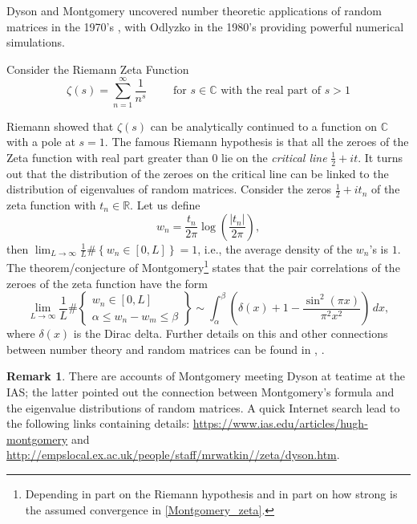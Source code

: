 \documentclass[letterpaper,11pt,oneside,reqno]{amsart}
\numberwithin{equation}{section}
\theoremstyle{definition}
\newtheorem{remark}[proposition]{Remark}
\begin{document}
Dyson and Montgomery uncovered number theoretic applications of random matrices 
in the 1970's \cite{montgomery1973pair}, with Odlyzko in the 1980's \cite{odlyzko1987distribution} providing powerful numerical simulations.

Consider the Riemann Zeta Function
\begin{equation*}
\zeta(s)=\sum_{n=1}^{\infty}\frac{1}{n^s} \qquad \text{ for } s\in \mathbb C \text{ with the real part of } s>1
\end{equation*}

Riemann showed that $\zeta(s)$ can be analytically continued to a function on
$\mathbb C$ with a pole at $s=1$.  The famous Riemann hypothesis is that all
the zeroes of the Zeta function with real part greater than 0 lie on the
\emph{critical line} $\frac{1}2+i t$.  It turns out that the distribution of
the zeroes on the critical line can be linked to the distribution of
eigenvalues of random matrices.  Consider the zeros $\frac12+it_n$ of the zeta function
with $t_n\in\mathbb{R}$. Let us define
\begin{equation*}
w_n=\frac{t_n}{2\pi}\log\left(\frac{|t_n|}{2\pi}\right),
\end{equation*}
then $\displaystyle \lim_{L\to\infty} \frac{1}{L} \#\left\{w_n\in [0,L]\right\}=1$, i.e., the 
average density of the $w_n$'s is $1$.
The theorem/conjecture of Montgomery\footnote{Depending in part
on the Riemann hypothesis and in part on 
how strong is the assumed convergence in \eqref{Montgomery_zeta}.} states that the pair correlations of the 
zeroes of the zeta function have the form
\begin{equation}\label{Montgomery_zeta}
	\lim_{L\to\infty} \frac{1}{L}\# \left\{\begin{array}{c} w_n\in [0,L] \\ \alpha\leq w_n-w_m\leq \beta \end{array}\right\} 
	\sim \int_\alpha^\beta \left(\delta(x)+1 -\frac{\sin^2(\pi x)}{\pi^2 x^2}\right)\, dx,
\end{equation}
where $\delta(x)$ is the Dirac delta.
Further details on this and other connections
between number theory and random matrices
can be found in \cite{keating2000random}, \cite{keating2006random}.

\begin{remark}
	There are accounts of Montgomery 
	meeting Dyson at teatime at the IAS; the latter pointed
	out the connection between Montgomery's formula and the eigenvalue
	distributions of random matrices. 
	A quick Internet search lead to the following links containing details:
	\url{https://www.ias.edu/articles/hugh-montgomery} and
	\url{http://empslocal.ex.ac.uk/people/staff/mrwatkin//zeta/dyson.htm}.
\end{remark}
\end{document}
